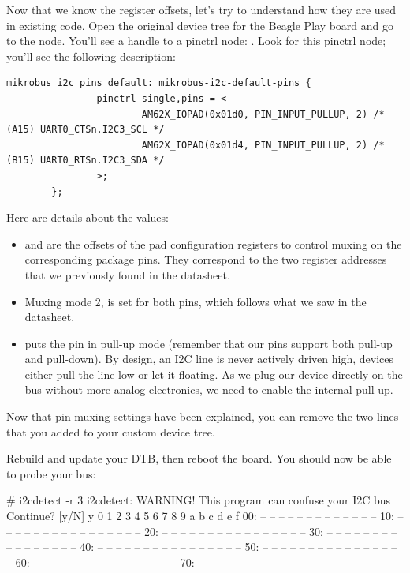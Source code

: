 Now that we know the register offsets, let's try to understand
how they are used in existing code. Open the original device tree
for the Beagle Play board and go to the  node.
You'll see a handle to a pinctrl node: .
Look for this pinctrl node; you'll see the following description:

\begin{verbatim}
mikrobus_i2c_pins_default: mikrobus-i2c-default-pins {
                pinctrl-single,pins = < 
                        AM62X_IOPAD(0x01d0, PIN_INPUT_PULLUP, 2) /* (A15) UART0_CTSn.I2C3_SCL */
                        AM62X_IOPAD(0x01d4, PIN_INPUT_PULLUP, 2) /* (B15) UART0_RTSn.I2C3_SDA */
                >;
        };
\end{verbatim}

Here are details about the values:

\begin{itemize}
\item {} and  are the offsets
      of the pad configuration registers to control muxing on the
      corresponding package pins. They correspond to the two register
      addresses that we previously found in the datasheet.
\item Muxing mode 2, is set for both pins, which follows what we saw in
      the datasheet.
\item {} puts the pin in pull-up mode (remember
      that our pins support both pull-up and pull-down). By design, an
      I2C line is never actively driven high, devices either pull the
      line low or let it floating. As we plug our device directly on the
      bus without more analog electronics, we need to enable the
      internal pull-up.
\end{itemize}

Now that pin muxing settings have been explained, you can remove the two
 lines that you added to your custom device tree.

Rebuild and update your DTB, then reboot the board. You should
now be able to probe your bus:

\begin{bashinput}
# i2cdetect -r 3
i2cdetect: WARNING! This program can confuse your I2C bus
Continue? [y/N] y
     0  1  2  3  4  5  6  7  8  9  a  b  c  d  e  f
00:          -- -- -- -- -- -- -- -- -- -- -- -- -- 
10: -- -- -- -- -- -- -- -- -- -- -- -- -- -- -- -- 
20: -- -- -- -- -- -- -- -- -- -- -- -- -- -- -- -- 
30: -- -- -- -- -- -- -- -- -- -- -- -- -- -- -- -- 
40: -- -- -- -- -- -- -- -- -- -- -- -- -- -- -- -- 
50: -- -- -- -- -- -- -- -- -- -- -- -- -- -- -- -- 
60: -- -- -- -- -- -- -- -- -- -- -- -- -- -- -- -- 
70: -- -- -- -- -- -- -- --
\end{bashinput}


